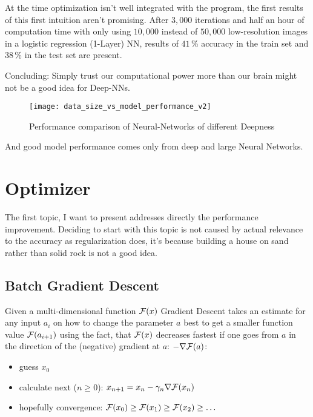 \documentclass[dvipsnames,twocolumn]{scrartcl}
\begin{document}
	At the time optimization isn't well integrated with the program, the first results of this first intuition aren't promising. After $3,000$ iterations and half an hour of computation time with only using $10,000$ instead of $50,000$ low-resolution images in a logistic regression (1-Layer) NN, results of $41$\,\% accuracy in the train set and $38$\,\% in the test set are present.
	
	Concluding: Simply trust our computational power more than our brain might not be a good idea for Deep-NNs.
	
	\begin{figure}
		\caption{Performance comparison of Neural-Networks of different Deepness}
		\texttt{[image: data\_size\_vs\_model\_performance\_v2]}%
	\end{figure}
	
	And good model performance comes only from deep and large Neural Networks.
	
	
	\section{Optimizer}
	
	The first topic, I want to present addresses directly the performance improvement. Deciding to start with this topic is not caused by actual relevance to the accuracy as regularization does, it's because building a house on sand rather than solid rock is not a good idea.
	
	\subsection{Batch Gradient Descent}
	
	Given a multi-dimensional function ${\cal F}(x)$ Gradient Descent takes an estimate for any input $a_i$ on how to change the parameter $a$ best to get a smaller function value ${\cal F}(a_{i+1})$ using the fact, that ${\cal F}(x)$ decreases fastest if one goes from $a$ in the direction of the (negative) gradient at $a$: $-\nabla {\cal F}(a)$:
	\begin{itemize}
		\item guess $x_0$
		\item calculate next ($n \ge 0$): $x_{n+1} = x_n - \gamma_n \nabla {\cal F}(x_n)$
		\item hopefully convergence: ${\cal F}(x_0) \ge {\cal F}(x_1) \ge {\cal F}(x_2) \ge \dots$
	\end{itemize}
	
\end{document}
